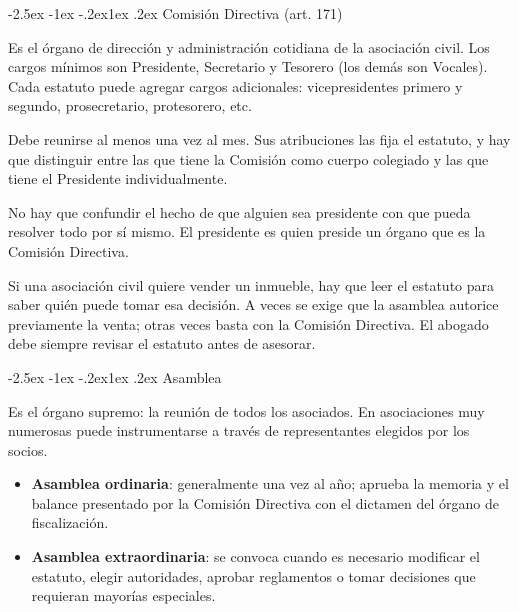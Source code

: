 \documentclass[12pt,oneside]{book}
\makeatletter
\renewcommand\subsection{\@startsection{subsection}{2}{\z@}%
  {-2.5ex \@plus -1ex \@minus -.2ex}{1ex \@plus .2ex}%
  {\normalfont\normalsize\bfseries}}
\makeatother
\begin{document}
\subsection{Comisión Directiva (art. 171)}

Es el órgano de dirección y administración cotidiana de la asociación civil. Los cargos mínimos son Presidente, Secretario y Tesorero (los demás son Vocales). Cada estatuto puede agregar cargos adicionales: vicepresidentes primero y segundo, prosecretario, protesorero, etc.

Debe reunirse al menos una vez al mes. Sus atribuciones las fija el estatuto, y hay que distinguir entre las que tiene la Comisión como cuerpo colegiado y las que tiene el Presidente individualmente.

\begin{importante}
No hay que confundir el hecho de que alguien sea presidente con que pueda resolver todo por sí mismo. El presidente es quien preside un órgano que es la Comisión Directiva.
\end{importante}

\begin{ejemplo}
Si una asociación civil quiere vender un inmueble, hay que leer el estatuto para saber quién puede tomar esa decisión. A veces se exige que la asamblea autorice previamente la venta; otras veces basta con la Comisión Directiva. El abogado debe siempre revisar el estatuto antes de asesorar.
\end{ejemplo}

\subsection{Asamblea}

Es el órgano supremo: la reunión de todos los asociados. En asociaciones muy numerosas puede instrumentarse a través de representantes elegidos por los socios.

\begin{itemize}
    \item \textbf{Asamblea ordinaria}: generalmente una vez al año; aprueba la memoria y el balance presentado por la Comisión Directiva con el dictamen del órgano de fiscalización.
    \item \textbf{Asamblea extraordinaria}: se convoca cuando es necesario modificar el estatuto, elegir autoridades, aprobar reglamentos o tomar decisiones que requieran mayorías especiales.
\end{itemize}
\end{document}
